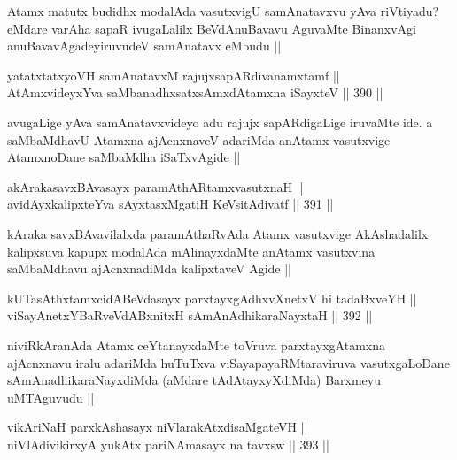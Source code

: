 \begin{artha}
Atamx matutx budidhx modalAda vasutxvigU samAnatavxvu yAva riVtiyadu? eMdare varAha sapaR ivugaLalilx BeVdAnuBavavu AguvaMte BinanxvAgi anuBavavAgadeyiruvudeV samAnatavx eMbudu ||
\end{artha}


\begin{shl}
yatatxtatxyoVH samAnatavxM rajujxsapARdivanamxtamf || \\
AtAmxvideyxYva saMbanadhxsatxsAmxdAtamxna iSayxteV ||  390 ||  
\end{shl}

\begin{artha}
avugaLige yAva samAnatavxvideyo adu rajujx sapARdigaLige iruvaMte ide. a saMbaMdhavU Atamxna ajAcnxnaveV  adariMda anAtamx vasutxvige AtamxnoDane saMbaMdha iSaTxvAgide ||
\end{artha}


\begin{shl}
akArakasavxBAvasayx paramAthARtamxvasutxnaH || \\
avidAyxkalipxteYva sAyxtasxMgatiH KeV\s sitAdivatf ||  391 ||  
\end{shl}

\begin{artha}
kAraka savxBAvavilalxda paramAthaRvAda Atamx vasutxvige AkAshadalilx kalipxsuva kapupx modalAda mAlinayxdaMte anAtamx vasutxvina saMbaMdhavu ajAcnxnadiMda kalipxtaveV Agide ||
\end{artha}

\begin{shl}
kUTasAthxtamxcidABeVda\s sayx parxtayxgAdhxvXnetxV hi tadaBxveYH || \\
viSayAnetxYBaRveVdABxnitxH sAmAnAdhikaraNayxtaH ||  392 ||  
\end{shl}

\begin{artha}
niviRkAranAda Atamx ceYtanayxdaMte toVruva parxtayxgAtamxna ajAcnxnavu iralu adariMda huTuTxva viSayapayaRMtaraviruva vasutxgaLoDane sAmAnadhikaraNayxdiMda (aMdare tAdAtayxyXdiMda) Barxmeyu uMTAguvudu ||
\end{artha}

\begin{shl}
vikAriNaH parxkAshasayx niVlarakAtxdisaMgateVH || \\
niVlAdivikirxyA yukAtx pariNAmasayx na tavxsw ||  393 ||  
\end{shl}

